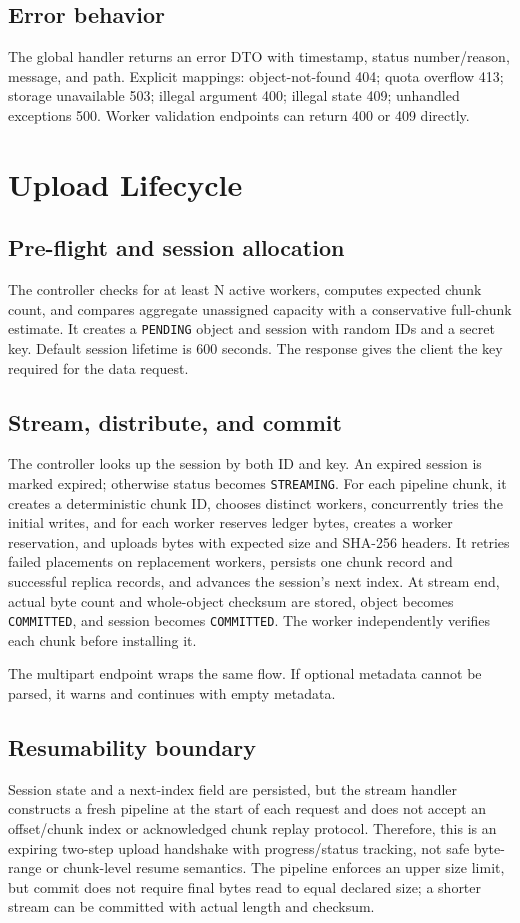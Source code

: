 \documentclass[11pt,a4paper]{article}
\begin{document}
\subsection{Error behavior}
The global handler returns an error DTO with timestamp, status number/reason, message, and path. Explicit mappings: object-not-found 404; quota overflow 413; storage unavailable 503; illegal argument 400; illegal state 409; unhandled exceptions 500. Worker validation endpoints can return 400 or 409 directly.

\section{Upload Lifecycle}
\subsection{Pre-flight and session allocation}
The controller checks for at least N active workers, computes expected chunk count, and compares aggregate unassigned capacity with a conservative full-chunk estimate. It creates a \texttt{PENDING} object and session with random IDs and a secret key. Default session lifetime is 600 seconds. The response gives the client the key required for the data request.
\subsection{Stream, distribute, and commit}
The controller looks up the session by both ID and key. An expired session is marked expired; otherwise status becomes \texttt{STREAMING}. For each pipeline chunk, it creates a deterministic chunk ID, chooses distinct workers, concurrently tries the initial writes, and for each worker reserves ledger bytes, creates a worker reservation, and uploads bytes with expected size and SHA-256 headers. It retries failed placements on replacement workers, persists one chunk record and successful replica records, and advances the session's next index. At stream end, actual byte count and whole-object checksum are stored, object becomes \texttt{COMMITTED}, and session becomes \texttt{COMMITTED}. The worker independently verifies each chunk before installing it.

The multipart endpoint wraps the same flow. If optional metadata cannot be parsed, it warns and continues with empty metadata.
\subsection{Resumability boundary}
Session state and a next-index field are persisted, but the stream handler constructs a fresh pipeline at the start of each request and does not accept an offset/chunk index or acknowledged chunk replay protocol. Therefore, this is an expiring two-step upload handshake with progress/status tracking, not safe byte-range or chunk-level resume semantics. The pipeline enforces an upper size limit, but commit does not require final bytes read to equal declared size; a shorter stream can be committed with actual length and checksum.
\end{document}
